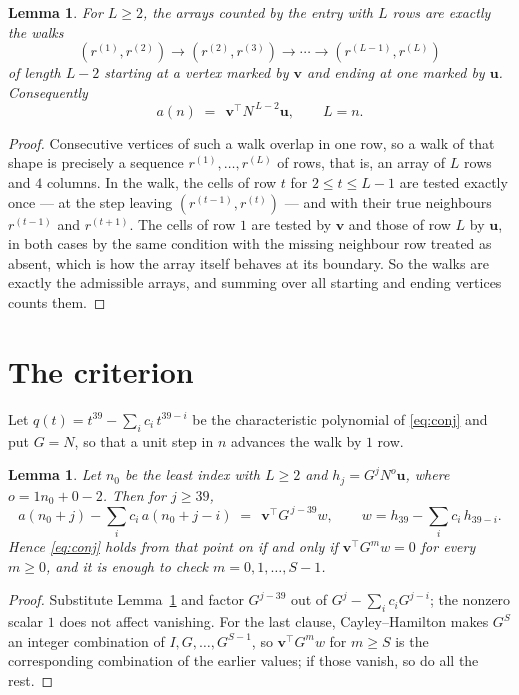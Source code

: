 \documentclass[11pt,a4paper]{article}
\theoremstyle{plain}
\newtheorem{lemma}[theorem]{Lemma}
\theoremstyle{definition}
\begin{document}
\begin{lemma}\label{lem:walk}
For $L\ge2$, the arrays counted by the entry with $L$ rows are exactly the walks
\[
(r^{(1)},r^{(2)})\to(r^{(2)},r^{(3)})\to\cdots\to(r^{(L-1)},r^{(L)})
\]
of length $L-2$ starting at a vertex marked by $\mathbf{v}$ and ending at one marked by
$\mathbf{u}$. Consequently
\[
a(n)\;=\;\,\mathbf{v}^{\!\top}N^{\,L-2}\mathbf{u},\qquad L=n .
\]
\end{lemma}

\begin{proof}
Consecutive vertices of such a walk overlap in one row, so a walk of that shape is
precisely a sequence $r^{(1)},\dots,r^{(L)}$ of rows, that is, an array of $L$ rows
and $4$ columns. In the walk, the cells of row $t$ for $2\le t\le L-1$ are tested
exactly once --- at the step leaving $(r^{(t-1)},r^{(t)})$ --- and with their true
neighbours $r^{(t-1)}$ and $r^{(t+1)}$. The cells of row $1$ are tested by
$\mathbf{v}$ and those of row $L$ by $\mathbf{u}$, in both cases by the same condition
with the missing neighbour row treated as absent, which is how the array itself behaves at
its boundary. So the walks are exactly the admissible arrays, and summing over all starting
and ending vertices counts them.
\end{proof}

\section{The criterion}

Let $q(t)=t^{39}-\sum_i c_i\,t^{39-i}$ be the characteristic polynomial of
\eqref{eq:conj} and put $G=N$, so that a unit step in $n$ advances the walk by
$1$ row.

\begin{lemma}\label{lem:crit}
Let $n_0$ be the least index with $L\ge2$ and $h_j=G^{j}N^{o}\mathbf{u}$, where
$o=1n_0+0-2$. Then for $j\ge39$,
\[
a(n_0+j)-\sum_i c_i\,a(n_0+j-i)\;=\;\,\mathbf{v}^{\!\top}G^{\,j-39}w,
\qquad w=h_{39}-\sum_i c_i\,h_{39-i} .
\]
Hence \eqref{eq:conj} holds from that point on if and only if
$\mathbf{v}^{\!\top}G^{m}w=0$ for every $m\ge0$, and it is enough to check
$m=0,1,\dots,S-1$.
\end{lemma}

\begin{proof}
Substitute Lemma~\ref{lem:walk} and factor $G^{j-39}$ out of
$G^{j}-\sum_ic_iG^{j-i}$; the nonzero scalar $1$ does not affect
vanishing. For the last clause, Cayley--Hamilton makes $G^{S}$ an integer combination of
$I,G,\dots,G^{S-1}$, so $\mathbf{v}^{\!\top}G^{m}w$ for $m\ge S$ is the corresponding
combination of the earlier values; if those vanish, so do all the rest.
\end{proof}
\end{document}
